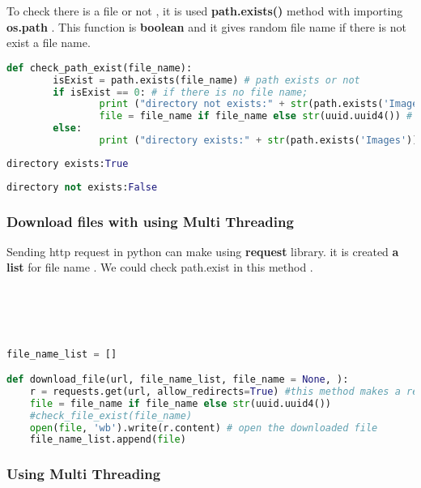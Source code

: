 \documentclass[onecolumn]{article}
\begin{document}
To check there is a file or not , it is used \textbf{path.exists()} method with importing\textbf{ os.path} . This function is\textbf{ boolean }and it gives random file name if there is not exist a file name.

\begin{lstlisting}[language=Python, caption= Checking Path]
def check_path_exist(file_name): 
        isExist = path.exists(file_name) # path exists or not 
        if isExist == 0: # if there is no file name;
        		print ("directory not exists:" + str(path.exists('Images')))
                file = file_name if file_name else str(uuid.uuid4()) # random file name 
        else:
                print ("directory exists:" + str(path.exists('Images')))
\end{lstlisting}

\begin{lstlisting}[language=Python, caption= Output1]
directory exists:True
\end{lstlisting}
\begin{lstlisting}[language=Python, caption= Output2]
directory not exists:False
\end{lstlisting}

 
\subsubsection{ Download  files with  using Multi Threading }
Sending http request in python can make using \textbf{request} library. it is created\textbf{ a list }for file name . We could check path.exist in this method . \\\\ \\\\

\begin{lstlisting}[language=Python, caption=Downloading files]

file_name_list = [] 

def download_file(url, file_name_list, file_name = None, ):
    r = requests.get(url, allow_redirects=True) #this method makes a request to a url
    file = file_name if file_name else str(uuid.uuid4())
    #check_file_exist(file_name)
    open(file, 'wb').write(r.content) # open the downloaded file
    file_name_list.append(file)
\end{lstlisting}


\subsubsection{Using Multi Threading }
\end{document}
